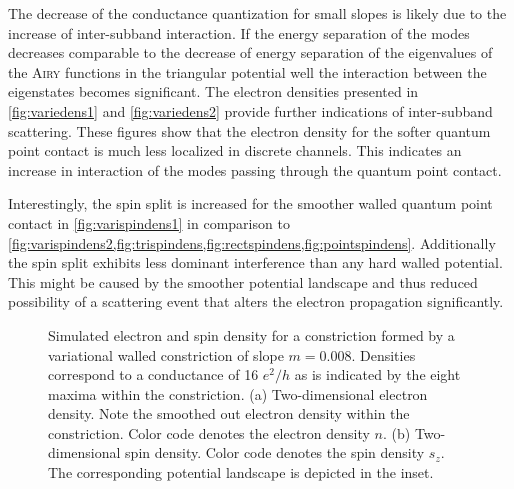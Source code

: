 The decrease of the conductance quantization for small slopes is likely due to the increase of inter-subband interaction. If the energy separation of the modes decreases comparable to the decrease of energy separation of the eigenvalues of the \textsc{Airy} functions in the triangular potential well the interaction between the eigenstates becomes significant. The electron densities presented in \cref{fig:variedens1} and \cref{fig:variedens2} provide further indications of inter-subband scattering. These figures show that the electron density for the softer quantum point contact is much less localized in discrete channels. This indicates an increase in interaction of the modes passing through the quantum point contact.\par
Interestingly, the spin split is increased for the smoother walled quantum point contact in \cref{fig:varispindens1} in comparison to \cref{fig:varispindens2,fig:trispindens,fig:rectspindens,fig:pointspindens}. Additionally the spin split exhibits less dominant interference than any hard walled potential. This might be caused by the smoother potential landscape and thus reduced possibility of a scattering event that alters the electron propagation significantly.\par
\begin{figure}[h]
  \hspace{14pt}
  \hspace{4pt}
  \caption{Simulated electron and spin density for a constriction formed by a variational walled constriction of slope $m=0.008$. Densities correspond to a conductance of 16 $e^2/h$ as is indicated by the eight maxima within the constriction. (a) Two-dimensional electron density. Note the smoothed out electron density within the constriction. Color code denotes the electron density $n$. (b) Two-dimensional spin density. Color code denotes the spin density $s_z$. The corresponding potential landscape is depicted in the inset.}
\end{figure}
